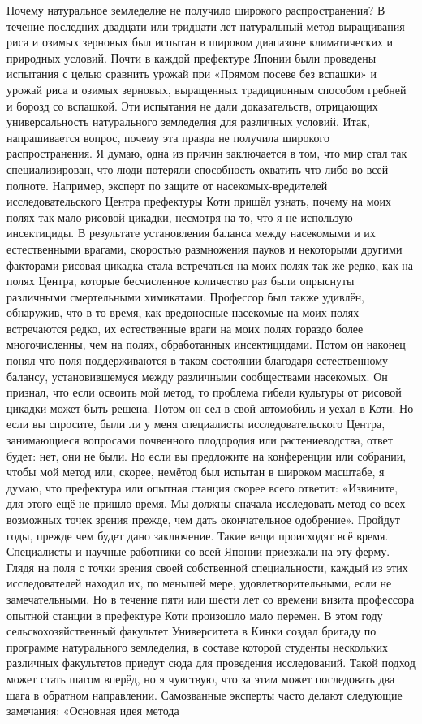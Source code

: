 \documentclass[a4paper]{book}
\begin{document}
Почему натуральное земледелие не получило
широкого распространения?
В течение последних двадцати или тридцати лет натуральный метод выращивания риса
и озимых зерновых был испытан в широком диапазоне климатических и природных условий.
Почти в каждой префектуре Японии были проведены испытания с целью сравнить урожай
при «Прямом посеве без вспашки» и урожай риса и озимых зерновых, выращенных
традиционным способом гребней и борозд со вспашкой. Эти испытания не дали
доказательств, отрицающих универсальность натурального земледелия для различных
условий.
Итак, напрашивается вопрос, почему эта правда не получила широкого
распространения. Я думаю, одна из причин заключается в том, что мир стал так
специализирован, что люди потеряли способность охватить что-либо во всей полноте.
Например, эксперт по защите от насекомых-вредителей исследовательского Центра
префектуры Коти пришёл узнать, почему на моих полях так мало рисовой цикадки, несмотря
на то, что я не использую инсектициды. В результате установления баланса между
насекомыми и их естественными врагами, скоростью размножения пауков и некоторыми
другими факторами рисовая цикадка стала встречаться на моих полях так же редко, как на
полях Центра, которые бесчисленное количество раз были опрыснуты различными
смертельными химикатами. Профессор был также удивлён, обнаружив, что в то время, как
вредоносные насекомые на моих полях встречаются редко, их естественные враги на моих
полях гораздо более многочисленны, чем на полях, обработанных инсектицидами. Потом он
наконец понял что поля поддерживаются в таком состоянии благодаря естественному
балансу, установившемуся между различными сообществами насекомых. Он признал, что
если освоить мой метод, то проблема гибели культуры от рисовой цикадки может быть
решена. Потом он сел в свой автомобиль и уехал в Коти.
Но если вы спросите, были ли у меня специалисты исследовательского Центра,
занимающиеся вопросами почвенного плодородия или растениеводства, ответ будет: нет, они
не были. Но если вы предложите на конференции или собрании, чтобы мой метод или,
скорее, немётод был испытан в широком масштабе, я думаю, что префектура или опытная
станция скорее всего ответит: «Извините, для этого ещё не пришло время. Мы должны
сначала исследовать метод со всех возможных точек зрения прежде, чем дать окончательное
одобрение». Пройдут годы, прежде чем будет дано заключение.
Такие вещи происходят всё время. Специалисты и научные работники со всей Японии
приезжали на эту ферму. Глядя на поля с точки зрения своей собственной специальности,
каждый из этих исследователей находил их, по меньшей мере, удовлетворительными, если не
замечательными. Но в течение пяти или шести лет со времени визита профессора опытной
станции в префектуре Коти произошло мало перемен.
В этом году сельскохозяйственный факультет Университета в Кинки создал бригаду по
программе натурального земледелия, в составе которой студенты нескольких различных
факультетов приедут сюда для проведения исследований. Такой подход может стать шагом
вперёд, но я чувствую, что за этим может последовать два шага в обратном направлении.
Самозванные эксперты часто делают следующие замечания: «Основная идея метода
\end{document}
